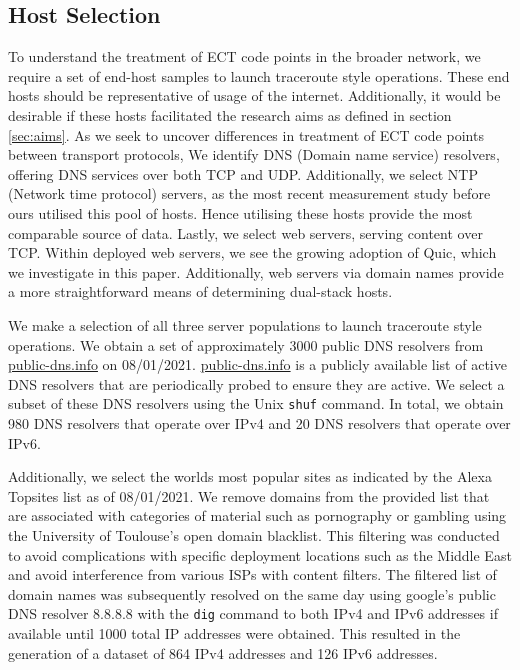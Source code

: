 \documentclass{l4proj}
\begin{document}
\subsection{Host Selection}

To understand the treatment of ECT code points in the broader network, we require a set of end-host samples to launch traceroute style operations. These end hosts should be representative of usage of the internet. Additionally, it would be desirable if these hosts facilitated the research aims as defined in section \ref{sec:aims}. As we seek to uncover differences in treatment of ECT code points between transport protocols, We identify DNS (Domain name service) resolvers, offering DNS services over both TCP and UDP.  Additionally, we select NTP (Network time protocol) servers, as the most recent measurement study before ours utilised this pool of hosts. Hence utilising these hosts provide the most comparable source of data. Lastly, we select web servers, serving content over TCP. Within deployed web servers, we see the growing adoption of Quic, which we investigate in this paper. Additionally, web servers via domain names provide a more straightforward means of determining dual-stack hosts.

We make a selection of all three server populations to launch traceroute style operations. We obtain a set of approximately 3000 public DNS resolvers from \href{https://public-dns.info}{public-dns.info} on 08/01/2021. \href{https://public-dns.info}{public-dns.info} is a publicly available list of active DNS resolvers that are periodically probed to ensure they are active. We select a subset of these DNS resolvers using the Unix \lstinline{shuf} command. In total, we obtain 980 DNS resolvers that operate over IPv4 and 20 DNS resolvers that operate over IPv6.

Additionally, we select the worlds most popular sites as indicated by the Alexa Topsites list as of 08/01/2021. We remove domains from the provided list that are associated with categories of material such as pornography or gambling using the University of Toulouse's open domain blacklist. This filtering was conducted to avoid complications with specific deployment locations such as the Middle East and avoid interference from various ISPs with content filters. The filtered list of domain names was subsequently resolved on the same day using google's public DNS resolver 8.8.8.8 with the \lstinline{dig} command to both IPv4 and IPv6 addresses if available until 1000 total IP addresses were obtained. This resulted in the generation of a dataset of 864 IPv4 addresses and 126 IPv6 addresses.
\end{document}
